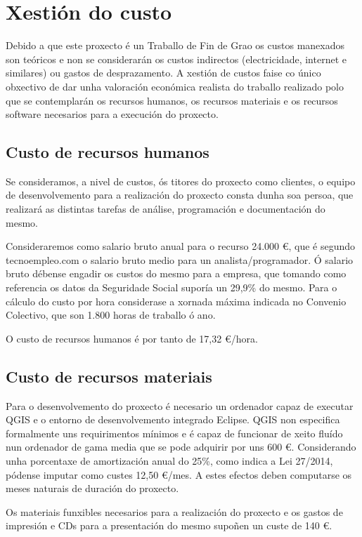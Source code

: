 \section{Xestión do custo}
Debido a que este proxecto é un Traballo de Fin de Grao os custos manexados son teóricos e non se considerarán os custos indirectos (electricidade, internet e similares) ou gastos de desprazamento. A xestión de custos faise co único obxectivo de dar unha valoración económica realista do traballo realizado polo que se contemplarán os recursos humanos, os recursos materiais e os recursos software necesarios para a execución do proxecto.

\subsection{Custo de recursos humanos}
Se consideramos, a nivel de custos, ós titores do proxecto como clientes, o equipo de desenvolvemento para a realización do proxecto consta dunha soa persoa, que realizará as distintas tarefas de análise, programación e documentación do mesmo.

Consideraremos como salario bruto anual para o recurso 24.000 \euro, que é segundo tecnoempleo.com\cite{InformeSalarios} o salario bruto medio para un analista/programador. Ó salario bruto débense engadir os custos do mesmo para a empresa, que tomando como referencia os datos da Seguridade Social\cite{TabCotizacion} suporía un 29,9\% do mesmo. Para o cálculo do custo por hora considerase a xornada máxima indicada no Convenio Colectivo\cite{BOEConvenio}, que son 1.800 horas de traballo ó ano.

O custo de recursos humanos é por tanto de 17,32 \euro/hora.

\subsection{Custo de recursos materiais}
Para o desenvolvemento do proxecto é necesario un ordenador capaz de executar QGIS e o entorno de desenvolvemento integrado Eclipse. QGIS non especifica formalmente uns requirimentos mínimos e é capaz de funcionar de xeito fluído nun ordenador de gama media que se pode adquirir por uns 600 \euro. Considerando unha porcentaxe de amortización anual do 25\%, como indica a Lei 27/2014\cite{Lei27/14}, pódense imputar como custes 12,50 \euro/mes. A estes efectos deben computarse os meses naturais de duración do proxecto.

Os materiais funxibles necesarios para a realización do proxecto e os gastos de impresión e CDs para a presentación do mesmo supoñen un custe de 140 \euro.

